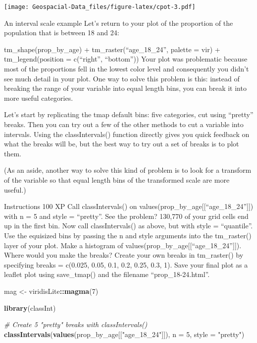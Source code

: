 \documentclass[]{article}
\newenvironment{Shaded}{\begin{snugshade}}{\end{snugshade}}
\newcommand{\CommentTok}[1]{\textcolor[rgb]{0.56,0.35,0.01}{\textit{#1}}}
\newcommand{\DataTypeTok}[1]{\textcolor[rgb]{0.13,0.29,0.53}{#1}}
\newcommand{\DecValTok}[1]{\textcolor[rgb]{0.00,0.00,0.81}{#1}}
\newcommand{\KeywordTok}[1]{\textcolor[rgb]{0.13,0.29,0.53}{\textbf{#1}}}
\newcommand{\NormalTok}[1]{#1}
\newcommand{\OperatorTok}[1]{\textcolor[rgb]{0.81,0.36,0.00}{\textbf{#1}}}
\newcommand{\StringTok}[1]{\textcolor[rgb]{0.31,0.60,0.02}{#1}}
\begin{document}
\texttt{[image: Geospacial-Data\_files/figure-latex/cpot-3.pdf]}

An interval scale example Let's return to your plot of the proportion of
the population that is between 18 and 24:

tm\_shape(prop\_by\_age) + tm\_raster(``age\_18\_24'', palette = vir) +
tm\_legend(position = c(``right'', ``bottom'')) Your plot was
problematic because most of the proportions fell in the lowest color
level and consequently you didn't see much detail in your plot. One way
to solve this problem is this: instead of breaking the range of your
variable into equal length bins, you can break it into more useful
categories.

Let's start by replicating the tmap default bins: five categories, cut
using ``pretty'' breaks. Then you can try out a few of the other methods
to cut a variable into intervals. Using the classIntervals() function
directly gives you quick feedback on what the breaks will be, but the
best way to try out a set of breaks is to plot them.

(As an aside, another way to solve this kind of problem is to look for a
transform of the variable so that equal length bins of the transformed
scale are more useful.)

Instructions 100 XP Call classIntervals() on
values(prop\_by\_age{[}{[}``age\_18\_24''{]}{]}) with n = 5 and style =
``pretty''. See the problem? 130,770 of your grid cells end up in the
first bin. Now call classIntervals() as above, but with style =
``quantile''. Use the equisized bins by passing the n and style
arguments into the tm\_raster() layer of your plot. Make a histogram of
values(prop\_by\_age{[}{[}``age\_18\_24''{]}{]}). Where would you make
the breaks? Create your own breaks in tm\_raster() by specifying breaks
= c(0.025, 0.05, 0.1, 0.2, 0.25, 0.3, 1). Save your final plot as a
leaflet plot using save\_tmap() and the filename ``prop\_18-24.html''.

\begin{Shaded}
\begin{Highlighting}[]
\NormalTok{mag <-}\StringTok{ }\NormalTok{viridisLite}\OperatorTok{::}\KeywordTok{magma}\NormalTok{(}\DecValTok{7}\NormalTok{)}

\KeywordTok{library}\NormalTok{(classInt)}

\CommentTok{# Create 5 "pretty" breaks with classIntervals()}
\KeywordTok{classIntervals}\NormalTok{(}\KeywordTok{values}\NormalTok{(prop_by_age[[}\StringTok{"age_18_24"}\NormalTok{]]), }
               \DataTypeTok{n =} \DecValTok{5}\NormalTok{, }\DataTypeTok{style =} \StringTok{"pretty"}\NormalTok{)}
\end{Highlighting}
\end{Shaded}
\end{document}
